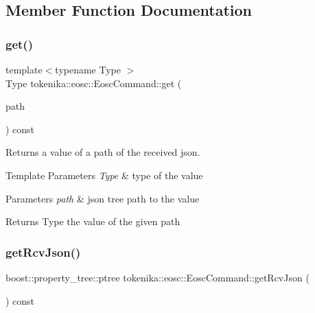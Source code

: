 \subsection{Member Function Documentation}
\mbox{\label{classtokenika_1_1eosc_1_1_eosc_command_aa1da6eb23f52159afa4a15e767cd7d6f}} 
\subsubsection{\texorpdfstring{get()}{get()}}
{\footnotesize\ttfamily template$<$typename Type $>$ \\
Type tokenika\+::eosc\+::\+Eosc\+Command\+::get (\begin{DoxyParamCaption}\item[{const boost\+::property\+\_\+tree\+::ptree\+::path\+\_\+type \&}]{path }\end{DoxyParamCaption}) const\hspace{0.3cm}{\ttfamily [inline]}}



Returns a value of a path of the received json. 


\begin{DoxyTemplParams}{Template Parameters}
{\em Type} & type of the value \\
\hline
\end{DoxyTemplParams}

\begin{DoxyParams}{Parameters}
{\em path} & json tree path to the value \\
\hline
\end{DoxyParams}
\begin{DoxyReturn}{Returns}
Type the value of the given path 
\end{DoxyReturn}
\mbox{\label{classtokenika_1_1eosc_1_1_eosc_command_a2b451aefc95258d481cff16747fa1888}} 
\subsubsection{\texorpdfstring{get\+Rcv\+Json()}{getRcvJson()}}
{\footnotesize\ttfamily boost\+::property\+\_\+tree\+::ptree tokenika\+::eosc\+::\+Eosc\+Command\+::get\+Rcv\+Json (\begin{DoxyParamCaption}{ }\end{DoxyParamCaption}) const\hspace{0.3cm}{\ttfamily [inline]}}




